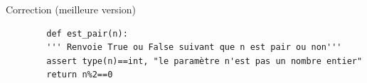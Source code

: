 \documentclass[10pt]{beamer}
\begin{document}
\begin{frame}[fragile]
	\mframe{\Python}
	\begin{exampleblock}{Correction (meilleure version)}
			      \begin{lstlisting}
		def est_pair(n):
		''' Renvoie True ou False suivant que n est pair ou non'''
		assert type(n)==int, "le paramètre n'est pas un nombre entier"
		return n%2==0
				\end{lstlisting}
	\end{exampleblock}
\end{frame}
\end{document}
